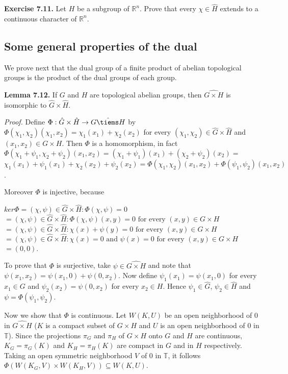 \documentclass[12pt]{article}
\begin{document}
\begin{itemize}
\begin{itemize}
\textbf{Exercise 7.11.} Let $H$ be a subgroup of $\mathbb{R}^n$. Prove that every $\chi \in \hat{H}$ extends to a continuous character of $\mathbb{R}^n$.


\subsection{Some general properties of the dual}
We prove next that the dual group of a finite product of abelian topological groups is the product of the dual
groups of each group.


\textbf{Lemma 7.12.} If $G$ and $H$ are topological abelian groups, then $\hat{G \times H}$ is isomorphic to $\hat{G} \times \hat{H}$.


\emph{Proof.} Define $\Phi : \hat{G} \times \hat{H} \to \hat{G \tiems H}$ by $\Phi(\chi_1, \chi_2)(\chi_1, x_2) = \chi_1(x_1) + \chi_2(x_2)$ for every $(\chi_1, \chi_2) \in \hat{G} \times \hat{H}$ and
$(x_1, x_2) \in G \times H$. Then $\Phi$ is a homomorphism, in fact $\Phi(\chi_1+\psi_1, \chi_2+\psi_2)(x_1, x_2) = (\chi_1+\psi_1)(x_1)+(\chi_2+\psi_2)(x_2) =$
$\chi_1 (x_1) + \psi_1 (x_1) + \chi_2 (x_2) + \psi_2 (x_2) = \Phi (\chi_1, \chi_2)(x_1, x_2) + \Phi (\psi_1, \psi_2)(x_1, x_2)$.


    Moreover $\Phi$ is injective, because


        $ker \Phi = {(\chi, \psi) \in \hat{G} \times \hat{H} : \Phi (\chi, \psi) = 0}$ 
            $ = {(\chi, \psi) \in \hat{G} \times \hat{H} : \Phi (\chi, \psi)(x, y) = 0 \text{ for every } (x, y) \in G \times H}$
            $ = {(\chi, \psi) \in \hat{G} \times \hat{H} : \chi(x) + \psi(y) = 0 \text{ for every } (x, y) \in G \times H}$
            $ = {(\chi, \psi) \in \hat{G} \times \hat{H} : \chi(x) = 0 \text{ and } \psi(x) = 0 \text{ for every } (x, y) \in G \times H}$
            $ = {(0, 0)}$.


    To prove that $\Phi$ is surjective, take $\psi \in \hat{G \times H}$ and note that $\psi(x_1, x_2) = \psi(x_1, 0) + \psi(0, x_2)$. Now define
$\psi_1(x_1) = \psi(x_1, 0)$ for every $x_1 \in G$ and $\psi_2(x_2) = \psi(0, x_2)$ for every $x_2 \in H$. Hence $\psi_1 \in \hat{G}$, $\psi_2 \in \hat{H}$ and
$\psi = \Phi(\psi_1, \psi_2)$.


    Now we show that $\Phi$ is continuous. Let $W(K, U)$ be an open neighborhood of $0$ in $\hat{G \times H}$ ($K$ is a compact
subset of $G \times H$ and $U$ is an open neighborhood of 0 in $\mathbb{T}$). Since the projections $\pi_G$ and $\pi_H$ of $G \times H$ onto
$G$ and $H$ are continuous, $K_G = \pi_G (K)$ and $K_H = \pi_H (K)$ are compact in $G$ and in $H$ respectively. Taking an
open symmetric neighborhood $V$ of 0 in $\mathbb{T}$, it follows $\Phi(W(K_G, V ) \times W(K_H, V )) \subseteq W(K, U)$.



\end{itemize}
\end{itemize}
\end{document}
